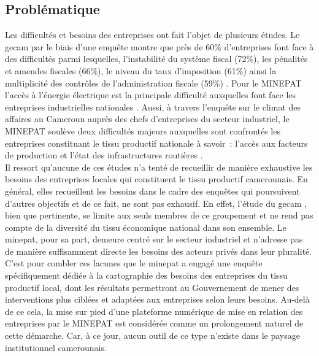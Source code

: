 \documentclass[12pt, a4paper, oneside]{report}
\begin{document}
	
	\subsection{Problématique}
	
	Les difficultés et besoins des entreprises ont fait l’objet de plusieurs études. Le \gls{gecam} par le biais d’une enquête montre que près de 60\% d’entreprises font face à des difficultés parmi lesquelles, l’instabilité du système fiscal (72\%), les pénalités et amendes fiscales (66\%), le niveau du taux d’imposition (61\%) ainsi la multiplicité des contrôles de l’administration fiscale (59\%) \cite{gecam2019}. Pour le MINEPAT  l’accès à l’énergie électrique est la principale difficulté auxquelles font face les entreprises industrielles nationales \cite{minepat2022}. Aussi, à travers l’enquête sur le climat des affaires au Cameroun auprès des chefs d’entreprises du secteur industriel, le MINEPAT  soulève deux difficultés majeurs auxquelles sont confrontés les entreprises constituant le tissu productif nationale à savoir : l’accès aux facteurs de production et l’état des infrastructures routières \cite{minepat2023}. \\
	
	Il ressort qu’aucune de ces études n’a tenté de recueillir de manière exhaustive les besoins des entreprises locales qui constituent le tissu productif camerounais. En général, elles recueillent les besoins dans le cadre des enquêtes qui poursuivent d’autres objectifs et de ce fait, ne sont pas exhausif. En effet, l’étude du \gls{gecam} , bien que pertinente, se limite aux seuls membres de ce groupement et ne rend pas compte de la diversité du tissu économique national dans son ensemble. Le \gls{minepat}, pour sa part, demeure centré sur le secteur industriel et n’adresse pas de manière suffisamment directe les besoins des acteurs privés dans leur pluralité.\\
	
	C’est pour combler ces lacunes que le \gls{minepat} a engagé une enquête spécifiquement dédiée à la cartographie des besoins des entreprises du tissu productif local, dont les résultats permettront au Gouvernement de mener des interventions plus ciblées et adaptées aux entreprises selon leurs besoins. Au-delà de ce cela, la mise sur pied d’une plateforme numérique de mise en relation des entreprises par le MINEPAT est considérée comme un prolongement naturel de cette démarche. Car, à ce jour, aucun outil de ce type n’existe dans le paysage institutionnel camerounais.\\
	
\end{document}
